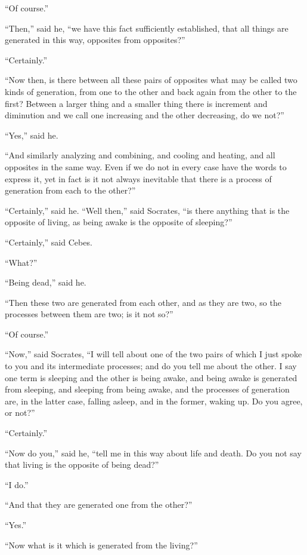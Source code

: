 \documentclass[letterpaper,12pt]{article}
\newcommand{\stephpag}[1]{\marginnote{\small\itshape\fontfamily{ppl}\selectfont #1}}
\begin{document}
\begin{drama}
``Of course.''
 
``Then,'' said he, ``we have this fact sufficiently established, that all things are generated in this way, opposites from opposites?''
 
``Certainly.''
 
``Now then, is there between all these pairs of opposites what may be called \stephpag{b} two kinds of generation, from one to the other and back again from the other to the first? Between a larger thing and a smaller thing there is increment and diminution and we call one increasing and the other decreasing, do we not?''
 
``Yes,'' said he.
 
``And similarly analyzing and combining, and cooling and heating, and all opposites in the same way. Even if we do not in every case have the words to express it, yet in fact is it not always inevitable that there is a process of generation from each to the other?''
 
``Certainly,'' said he. \stephpag{c} ``Well then,'' said Socrates, ``is there anything that is the opposite of living, as being awake is the opposite of sleeping?''
 
``Certainly,'' said Cebes.
 
``What?''
 
``Being dead,'' said he.
 
``Then these two are generated from each other, and as they are two, so the processes between them are two; is it not so?''
 
``Of course.''
 
``Now,'' said Socrates, ``I will tell about one of the two pairs of which I just spoke to you and its intermediate processes; and do you tell me about the other. I say one term is sleeping and the other is being awake, and being awake is generated from sleeping, and sleeping from being awake, \stephpag{d} and the processes of generation are, in the latter case, falling asleep, and in the former, waking up. Do you agree, or not?''
 
``Certainly.''
 
``Now do you,'' said he, ``tell me in this way about life and death. Do you not say that living is the opposite of being dead?''
 
``I do.''
 
``And that they are generated one from the other?''
 
``Yes.''
 
``Now what is it which is generated from the living?''
 

\end{drama}
\end{document}
